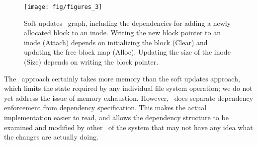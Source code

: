 \begin{figure}[htb]
  \centering
  \texttt{[image: fig/figures\_3]}
  \caption{\label{fig:softupdate} Soft updates \chdesc\ graph,
  including the dependencies for adding a newly allocated block to an
  inode. Writing the new block pointer to an inode (Attach) depends on
  initializing the block (Clear) and updating the free block map (Alloc).
  Updating the size of the inode (Size) depends on writing the block
  pointer.}
\end{figure}


The \Kudos\ approach certainly takes more memory than the soft updates approach,
which limits the state required by any individual file system operation; we do
not yet address the issue of memory exhaustion.
%
However, \Kudos\ does separate dependency enforcement from dependency
specification. This makes the actual implementation easier to read, and allows
the dependency structure to be examined and modified by other \modules\ of the
system that may not have any idea what the changes are actually doing.
